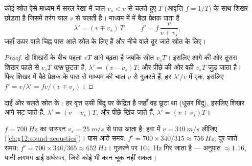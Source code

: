 \begin{proposition}[चलता स्रोत]\label{prop:g12:doppler-effect:moving-source}
कोई स्रोत ऐसे माध्यम में सरल रेखा में चाल $v_s < v$ से चलते हुए
 $T$ (आवृत्ति $f = 1/T$) के साथ शिखर छोड़ता है जिसमें
तरंग चाल $v$ से चलती है। माध्यम में  में बैठा प्रेक्षक पाता
है
\[
\lambda' = (v \mp v_s)\,T, \qquad f' = f\,\frac{v}{v \mp v_s},
\]
जहाँ ऊपर वाले चिह्न पास आते स्रोत के लिए हैं और नीचे वाले दूर जाते स्रोत के
लिए।
\end{proposition}

\begin{proof}
दो शिखरों के बीच पहला $vT$ आगे बढ़ता है जबकि स्रोत $v_s T$। इसलिए आगे की ओर
दूसरा शिखर पहले से $v_s T$ \emph{पास} छूटता है, $\lambda' = (v - v_s)T$; और पीछे की ओर वही
$v_s T$ जुड़ जाता है। फिर शिखर  में बैठे प्रेक्षक के पास से माध्यम की चाल
$v$ से गुज़रते हैं, हर $\lambda'/v$  में एक, इसलिए $f' = v/\lambda' = f v/(v \mp v_s)$।
\end{proof}

\begin{omfigure}

{\small दाईं ओर चलते स्रोत के : हर वृत्त उसी बिंदु पर केंद्रित
है जहाँ वह छूटा था (धूसर बिंदु), इसलिए शिखर आगे सट जाते हैं, $\lambda' = (v - v_s)T$, और पीछे
खिंच जाते हैं, $\lambda' = (v + v_s)T$।}
\end{omfigure}

\begin{example}[एंबुलेंस, संख्याओं में]\label{ex:g12:doppler-effect:siren}
$f = \qty{700}{Hz}$ का सायरन $v_s = \qty{25}{m/s}$ से पास आता है; हवा में $v = \qty{340}{m/s}$ लीजिए (\cref{ch:g12:sound-acoustics})। पास आते
समय: $f' = 700 \times 340/315 \approx \qty{756}{Hz}$; दूर जाते समय: $f' = 700 \times 340/365 \approx \qty{652}{Hz}$। गुज़रने पर  \qty{104}{Hz} गिर जाता
है --- अनुपात $\approx 1.16$, यानी लगभग ढाई अर्धस्वर, जिसे कोई भी कान चूक नहीं सकता।
\end{example}

